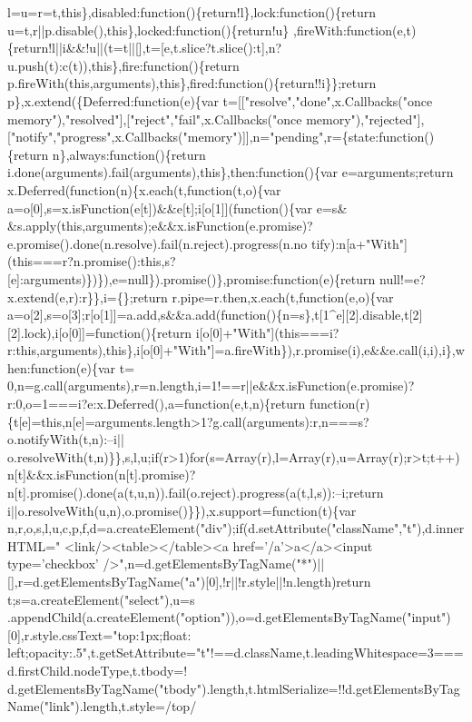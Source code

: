 \begin{DoxyCode}
{       l=u=r=t,this\},disabled:function()\{return!l\},lock:function()\{return
       u=t,r||p.disable(),this\},locked:function()\{return!u\}
      ,fireWith:function(e,t)\{return!l||i&&!u||(t=t||[],t=[e,t.slice?t.slice():t],n?u.push(t):c(t)),this\},fire:function()\{return p.fireWith(this,arguments),this\},fired:function()\{return!!i\}\};return
       p\},x.extend(\{Deferred:function(e)\{var t=[["resolve","done",x.Callbacks("once
       memory"),"resolved"],["reject","fail",x.Callbacks("once memory"),"rejected"],["notify","progress",x.Callbacks("memory")]],n="pending",r=\{state:function()\{return
       n\},always:function()\{return i.done(arguments).fail(arguments),this\},then:function()\{var e=arguments;return
       x.Deferred(function(n)\{x.each(t,function(t,o)\{var a=o[0],s=x.isFunction(e[t])&&e[t];i[o[1]](function()\{var
       e=s&
      &s.apply(this,arguments);e&&x.isFunction(e.promise)?e.promise().done(n.resolve).fail(n.reject).progress(n.no
      tify):n[a+"With"](this===r?n.promise():this,s?[e]:arguments)\})\}),e=null\}).promise()\},promise:function(e)\{return null!=e?x.extend(e,r):r\}\},i=\{\};return r.pipe=r.then,x.each(t,function(e,o)\{var
       a=o[2],s=o[3];r[o[1]]=a.add,s&&a.add(function()\{n=s\},t[1^e][2].disable,t[2][2].lock),i[o[0]]=function()\{return
       i[o[0]+"With"](this===i?r:this,arguments),this\},i[o[0]+"With"]=a.fireWith\}),r.promise(i),e&&e.call(i,i),i\},when:function(e)\{var
       t=
      0,n=g.call(arguments),r=n.length,i=1!==r||e&&x.isFunction(e.promise)?r:0,o=1===i?e:x.Deferred(),a=function(e,t,n)\{return
       function(r)\{t[e]=this,n[e]=arguments.length>1?g.call(arguments):r,n===s?o.notifyWith(t,n):--i||
      o.resolveWith(t,n)\}\},s,l,u;if(r>1)for(s=Array(r),l=Array(r),u=Array(r);r>t;t++)n[t]&&x.isFunction(n[t].promise)?n[t].promise().done(a(t,u,n)).fail(o.reject).progress(a(t,l,s)):--i;return
       i||o.resolveWith(u,n),o.promise()\}\}),x.support=function(t)\{var
       n,r,o,s,l,u,c,p,f,d=a.createElement("div");if(d.setAttribute("className","t"),d.innerHTML="  <link/><table></table><a href='}/a\textcolor{stringliteral}{'>a</a><input type='}checkbox\textcolor{stringliteral}{'
      />",n=d.getElementsByTagName("*")||[],r=d.getElementsByTagName("a")[0],!r||!r.style||!n.length)return
       t;s=a.createElement("select"),u=s
      .appendChild(a.createElement("option")),o=d.getElementsByTagName("input")[0],r.style.cssText="top:1px;float:
      left;opacity:.5",t.getSetAttribute="t"!==d.className,t.leadingWhitespace=3===d.firstChild.nodeType,t.tbody=!
      d.getElementsByTagName("tbody").length,t.htmlSerialize=!!d.getElementsByTagName("link").length,t.style=/top/
}
\end{DoxyCode}
